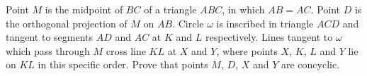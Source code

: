 Point $M$ is the midpoint of $BC$ of a triangle $ABC$, in which $AB=AC$. Point $D$ is the orthogonal projection of $M$ on $AB$. Circle $\omega$ is inscribed in triangle $ACD$ and tangent to segments $AD$ and $AC$ at $K$ and $L$ respectively. Lines tangent to $\omega$ which pass through $M$ cross line $KL$ at $X$ and $Y$, where points $X$, $K$, $L$ and $Y$ lie on $KL$ in this specific order. Prove that points $M$, $D$, $X$ and $Y$ are concyclic.